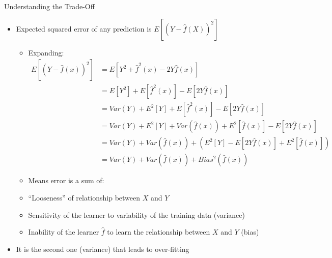 \documentclass[aspectratio=169]{beamer}
\begin{document}
\begin{frame}{Understanding the Trade-Off}

\begin{itemize}
\item Expected squared error of any prediction is $E[(Y - \hat{f}(X))^2]$
	\begin{itemize}
	\item Expanding:
	\begin{align}
	E[(Y - \hat{f}(x))^2] &= E[Y^2 + \hat{f}^2(x) - 2Y\hat{f}(x)] \nonumber \\
			      &= E[Y^2] + E[\hat{f}^2(x)] - E[2Y\hat{f}(x)] \nonumber \\
			      &= Var(Y) + E^2[Y] + E[\hat{f}^2(x)] - E[2Y\hat{f}(x)] \nonumber \\
			      &=  Var(Y) + E^2[Y] + Var(\hat{f}(x)) + E^2[\hat{f}(x)] - E[2Y\hat{f}(x)] \nonumber \\
			      &= Var(Y) + Var(\hat{f}(x)) + (E^2[Y] - E[2Y\hat{f}(x)] + E^2[\hat{f}(x)]) \nonumber \\
			      &= Var(Y) + Var(\hat{f}(x)) + Bias^2(\hat{f}(x)) \nonumber
	\end{align}
	\item Means error is a sum of:
	\item ``Looseness'' of relationship between $X$ and $Y$
	\item Sensitivity of the learner to variability of the training data (variance)
	\item Inability of the learner $\hat{f}$ to learn the relationship between $X$ and $Y$ (bias)
	\end{itemize}
\item It is the second one (variance) that leads to over-fitting
\end{itemize}
\end{frame}
\end{document}
